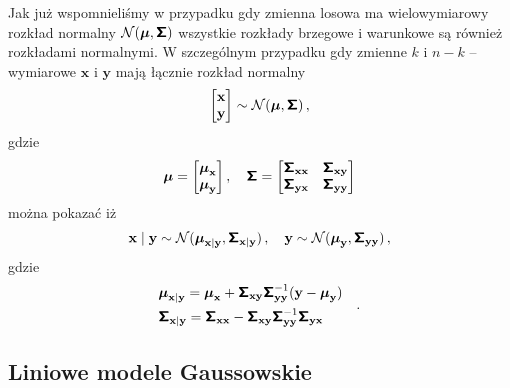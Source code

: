 \documentclass{myclass}
\begin{document}
Jak już wspomnieliśmy w przypadku gdy zmienna losowa ma wielowymiarowy rozkład normalny
\(\mathcal{N}(\boldsymbol{\mu}, \boldsymbol{\mathsf{\Sigma}})\) wszystkie rozkłady brzegowe i warunkowe są również
rozkładami normalnymi. W szczególnym przypadku gdy zmienne \(k\) i \(n-k\) --wymiarowe
\(\mathbf{x}\) i \(\mathbf{y}\) mają łącznie rozkład normalny
\begin{equation*}
    \mqty[\mathbf{x} \\ \mathbf{y}] \sim \mathcal{N}(\boldsymbol{\mu}, \oper{\Sigma})\,,
\end{equation*}
gdzie
\begin{equation*}
    \boldsymbol{\mu} = \mqty[\boldsymbol{\mu}_\mathbf{x} \\ \boldsymbol{\mu}_\mathbf{y}]\,,\quad \oper{\Sigma} = \mqty[\oper{\Sigma}_{\mathbf{xx}} & \oper{\Sigma}_{\mathbf{xy}} \\ \oper{\Sigma}_{\mathbf{yx}} & \oper{\Sigma}_\mathbf{yy}]
\end{equation*}
można pokazać iż
\begin{equation*}
    \mathbf{x} \mid \mathbf{y} \sim \mathcal{N}(\boldsymbol{\mu}_{\mathbf{x}|\mathbf{y}}, \boldsymbol{\mathsf{\Sigma}}_{\mathbf{x}|\mathbf{y}})\,,\quad \mathbf{y} \sim \mathcal{N}(\boldsymbol{\mu}_\mathbf{y}, \boldsymbol{\mathsf{\Sigma}}_\mathbf{yy})\,,
\end{equation*}
gdzie
\begin{equation*}
    \begin{split}
        &\boldsymbol{\mu}_{\mathbf{x}|\mathbf{y}} = \boldsymbol{\mu}_\mathbf{x} + \boldsymbol{\mathsf{\Sigma}}_\mathbf{xy}\boldsymbol{\mathsf{\Sigma}}_\mathbf{yy}^{-1}(\mathbf{y} - \boldsymbol{\mu}_\mathbf{y})\\
        &\boldsymbol{\mathsf{\Sigma}}_{\mathbf{x}|\mathbf{y}} = \boldsymbol{\mathsf{\Sigma}}_\mathbf{xx} - \boldsymbol{\mathsf{\Sigma}}_\mathbf{xy}\boldsymbol{\mathsf{\Sigma}}_\mathbf{yy}^{-1}\boldsymbol{\mathsf{\Sigma}}_\mathbf{yx}
    \end{split}\quad.
\end{equation*}

\subsection{Liniowe modele Gaussowskie}
\end{document}
